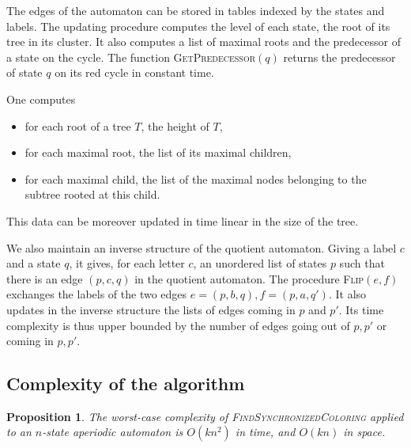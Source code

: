 \documentclass[11pt,a4paper]{article}
\newtheorem{proposition}[theorem]{Proposition}
\begin{document}
The edges of the automaton can be stored in tables indexed by the
states and labels. The updating procedure computes the level of each
state, the root of its tree in its cluster.  It also computes a list
of maximal roots and the predecessor of a state on the cycle.  The
function \textsc{GetPredecessor}$(q)$ returns the predecessor of state
$q$ on its red cycle in constant time.

One computes 
\begin{itemize}
\item for each root of a tree $T$, the height of $T$,
\item for each maximal root, the list of its maximal children,
\item for each maximal child, the list of the maximal nodes belonging
  to the subtree rooted at this child.
\end{itemize}
This data can be moreover updated in time linear in the size of the
tree.

We also maintain an inverse structure of the quotient
automaton. Giving a label $c$ and a state $q$, it gives, for each
letter $c$, an unordered list of states $p$ such that there is an edge
$(p,c,q)$ in the quotient automaton. The procedure
\textsc{Flip}$(e,f)$ exchanges the labels of the two edges
$e=(p,b,q),f=(p,a,q')$. It also updates in the inverse structure the
lists of edges coming in $p$ and $p'$. Its time complexity is thus
upper bounded by the number of edges going out of $p,p'$ or coming in
$p,p'$.


\subsection{Complexity of the algorithm} 

\begin{proposition} \label{proposition.complexity}
The worst-case complexity of \textsc{FindSynchronizedColoring}
applied to an $n$-state aperiodic automaton is $O(kn^2)$
in time, and $O(kn)$ in space.
\end{proposition}
\end{document}
